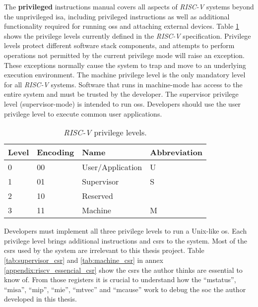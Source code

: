The \textbf{privileged} instructions manual covers all aspects of \textit{RISC-V} systems beyond the unprivileged \acrshort{isa}, including privileged instructions as well as additional functionality required for running \acrlong{os}s and attaching external devices. Table \ref{tab:riscv_privilege_levels} shows the privilege levels currently defined in the \textit{RISC-V} specification. Privilege levels protect different software stack components, and attempts to perform operations not permitted by the current privilege mode will raise an exception. These exceptions normally cause the system to trap and move to an underlying execution environment. The \acrfull{machine} privilege level is the only mandatory level for all \textit{RISC-V} systems. Software that runs in \acrshort{machine}-mode has access to the entire system and must be trusted by the developer. The \acrfull{supervisor} privilege level (\acrshort{supervisor}-mode) is intended to run \acrlong{os}s. Developers should use the \acrfull{user} privilege level to execute common user applications.

\begin{table}[!ht]
    \centering
    \begin{tabular}{|l|l|l|l|}
    \hline
    \textbf{Level} & \textbf{Encoding} & \textbf{Name}    & \textbf{Abbreviation} \\ \hline
    0              & 00                & User/Application & U                     \\ \hline
    1              & 01                & Supervisor       & S                     \\ \hline
    2              & 10                & Reserved         &                       \\ \hline
    3              & 11                & Machine          & M                     \\ \hline
    \end{tabular}
    \caption{\textit{RISC-V} privilege levels.}
    \label{tab:riscv_privilege_levels}
\end{table}

Developers must implement all three privilege levels to run a Unix-like \acrlong{os}. Each privilege level brings additional instructions and \acrlong{csr}s to the system. Most of the \acrshort{csr}s used by the system are irrelevant to this thesis project. Table \ref{tab:supervisor_csr} and \ref{tab:machine_csr} in annex \ref{appendix:riscv_essencial_csr} show the \acrshort{csr}s the author thinks are essential to know of. From those registers it is crucial to understand how the \enquote{mstatus}, \enquote{misa}, \enquote{mip}, \enquote{mie}, \enquote{mtvec} and \enquote{mcause} work to debug the \acrshort{soc} the author developed in this thesis.

